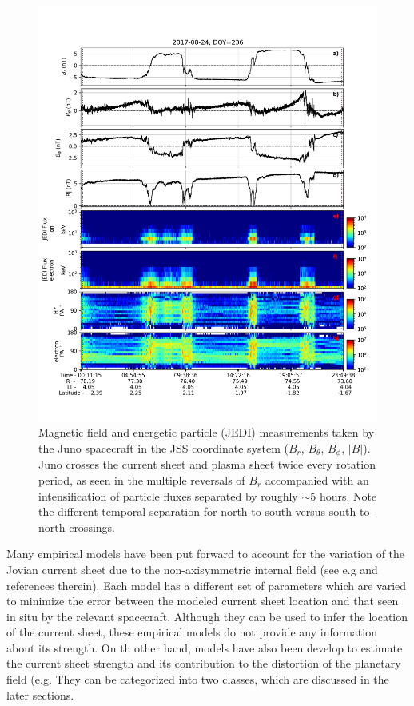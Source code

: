 \begin{figure}
    \centering
    \includegraphics[height=0.8\textheight]{images6/Juno-currentsheet-magjedi.png}
    \caption{Magnetic field and energetic particle (JEDI) measurements taken by the Juno spacecraft in the JSS coordinate system ($B_r$, $B_\theta$, $B_\phi$, $|B|$). Juno crosses the current sheet and plasma sheet twice every rotation period, as seen in the multiple reversals of $B_r$ accompanied with an intensification of particle fluxes separated by roughly $\sim$5 hours. Note the different temporal separation for north-to-south versus south-to-north crossings.}
    \label{fig:juno-current-sheet}
\end{figure}

Many empirical models have been put forward to account for the variation of the Jovian current sheet due to the non-axisymmetric internal field (see e.g  and references therein). Each model has a different set of parameters which are varied to minimize the error between the modeled current sheet location and that seen in situ by the relevant spacecraft. Although they can be used to infer the location of the current sheet, these empirical models do not provide any information about its strength. On th other hand, models have also been develop to estimate the current sheet strength and its contribution to the distortion of the planetary field (e.g. 
They can be categorized into two classes, which are discussed in the later sections. 

